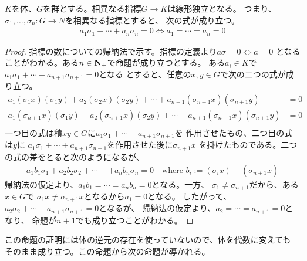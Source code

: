 {	\begin{proposition}[指標の独立性]\label{prop:指標の独立性} %
		$K$を体、$G$を群とする。相異なる指標$G\to K$は線形独立となる。
		つまり、$\sigma_1,\dots,\sigma_n:G\to N$を相異なる指標とすると、
		次の式が成り立つ。
		\begin{equation*}\begin{split}
			a_1\sigma_1 +\cdots+ a_n\sigma_n = 0 \iff a_1 =\cdots= a_n = 0
		\end{split}\end{equation*}
	\end{proposition} %
	\begin{proof} %
		指標の数についての帰納法で示す。指標の定義より$a\sigma=0\iff a=0$
		となることがわかる。ある$n\in\mathbf{N}_+$で命題が成り立つとする。
		ある$a_i\in K$で$a_1\sigma_1+\cdots+a_{n+1}\sigma_{n+1}=0$となる
		とすると、任意の$x,y\in G$で次の二つの式が成り立つ。
		\begin{equation*}\begin{split}
			a_1(\sigma_1x)(\sigma_1y)+a_2(\sigma_2x)(\sigma_2y)
				+\cdots+a_{n+1}(\sigma_{n+1}x)(\sigma_{n+1}y) &= 0 \\
			a_1(\sigma_{n+1}x)(\sigma_1y)+a_2(\sigma_{n+1}x)(\sigma_2y)
				+\cdots+a_{n+1}(\sigma_{n+1}x)(\sigma_{n+1}y) &= 0 \\
		\end{split}\end{equation*}
		一つ目の式は積$xy\in G$に$a_1\sigma_1+\cdots+a_{n+1}\sigma_{n+1}$を
		作用させたもの、二つ目の式は$y$に
		$a_1\sigma_1+\cdots+a_{n+1}\sigma_{n+1}$を作用させた後に$\sigma_{n+1}x$
		を掛けたものである。二つの式の差をとると次のようになるが、
		\begin{equation*}\begin{split}
			a_1b_1\sigma_1 + a_2b_2\sigma_2 +\cdots+ + a_nb_n\sigma_n = 0
			\quad\text{where } b_i := (\sigma_ix) - (\sigma_{n+1}x)
		\end{split}\end{equation*}
		帰納法の仮定より、$a_1b_1=\cdots=a_nb_n=0$となる。一方、
		$\sigma_1\neq\sigma_{n+1}$だから、ある$x\in G$で
		$\sigma_1x\neq\sigma_{n+1}x$となるから$a_1=0$となる。
		したがって、$a_2\sigma_2+\cdots+a_{n+1}\sigma_{n+1}=0$となるが、
		帰納法の仮定より、$a_2=\cdots=a_{n+1}=0$となり、
		命題が$n+1$でも成り立つことがわかる。
	\end{proof} %

	この命題の証明には体の逆元の存在を使っていないので、体を代数に変えても
	そのまま成り立つ。この命題から次の命題が導かれる。

}
